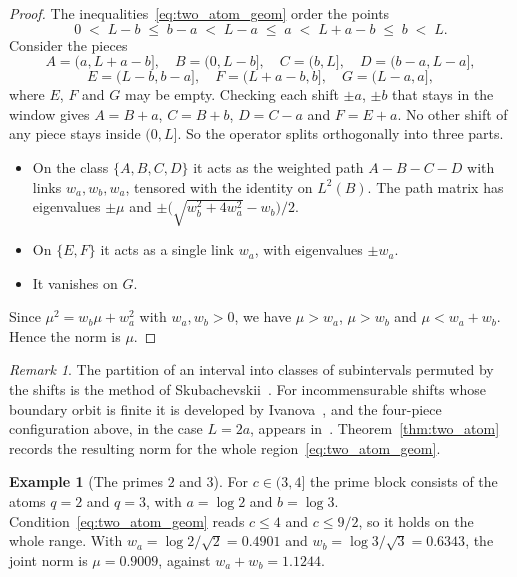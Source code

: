 \documentclass[11pt,a4paper]{article}
\theoremstyle{plain}
\theoremstyle{definition}
\newtheorem{example}[theorem]{Example}
\theoremstyle{remark}
\newtheorem{remark}[theorem]{Remark}
\begin{document}
\begin{proof}
The inequalities~\eqref{eq:two_atom_geom} order the points
\[
  0 \;<\; L - b \;\le\; b - a \;<\; L - a \;\le\; a \;<\; L + a - b \;\le\; b \;<\; L .
\]
Consider the pieces
\[
  A = (a, L + a - b], \quad B = (0, L - b], \quad C = (b, L], \quad D = (b - a, L - a],
\]
\[
  E = (L - b, b - a], \quad F = (L + a - b, b], \quad G = (L - a, a],
\]
where $E$, $F$ and $G$ may be empty. Checking each shift $\pm a$, $\pm b$ that stays in the window gives $A = B + a$, $C = B + b$, $D = C - a$ and $F = E + a$. No other shift of any piece stays inside $(0, L]$. So the operator splits orthogonally into three parts.
\begin{itemize}[leftmargin=1.8em]
  \item On the class $\{A, B, C, D\}$ it acts as the weighted path $A - B - C - D$ with links $w_a, w_b, w_a$, tensored with the identity on $L^2(B)$. The path matrix has eigenvalues $\pm\mu$ and $\pm\bigl(\sqrt{w_b^2 + 4w_a^2} - w_b\bigr)/2$.
  \item On $\{E, F\}$ it acts as a single link $w_a$, with eigenvalues $\pm w_a$.
  \item It vanishes on $G$.
\end{itemize}
Since $\mu^2 = w_b\mu + w_a^2$ with $w_a, w_b > 0$, we have $\mu > w_a$, $\mu > w_b$ and $\mu < w_a + w_b$. Hence the norm is $\mu$.
\end{proof}

\begin{remark}
The partition of an interval into classes of subintervals permuted by the shifts is the method of Skubachevskii~\cite{Skubachevskii1997, Skubachevskii2016}. For incommensurable shifts whose boundary orbit is finite it is developed by Ivanova~\cite{Ivanova2023}, and the four-piece configuration above, in the case $L = 2a$, appears in~\cite[\S2]{Ivanova2023}. Theorem~\ref{thm:two_atom} records the resulting norm for the whole region~\eqref{eq:two_atom_geom}.
\end{remark}

\begin{example}[The primes $2$ and $3$]\label{ex:two_three}
For $c \in (3, 4]$ the prime block consists of the atoms $q = 2$ and $q = 3$, with $a = \log 2$ and $b = \log 3$. Condition~\eqref{eq:two_atom_geom} reads $c \le 4$ and $c \le 9/2$, so it holds on the whole range. With $w_a = \log 2/\sqrt 2 = 0.4901$ and $w_b = \log 3/\sqrt 3 = 0.6343$, the joint norm is $\mu = 0.9009$, against $w_a + w_b = 1.1244$.
\end{example}
\end{document}
